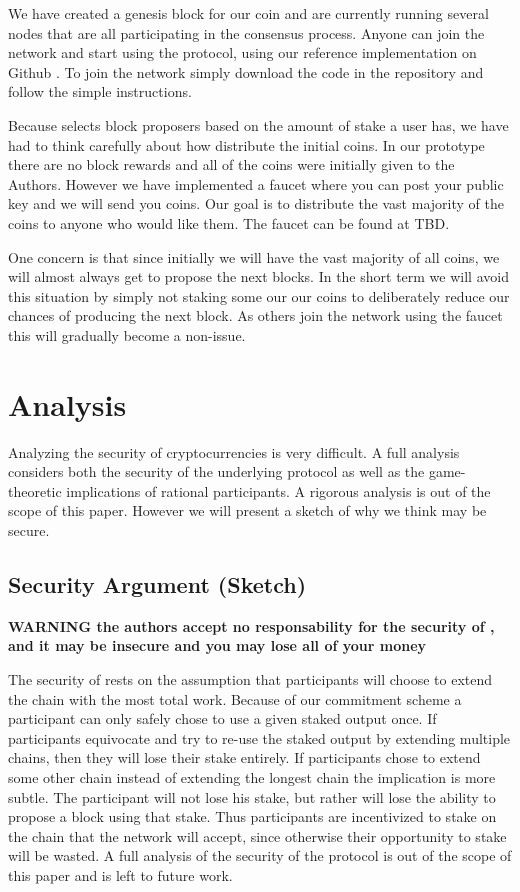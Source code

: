 \documentclass{article}
\begin{document}
We have created a genesis block for our coin and are currently running several nodes that are all participating in the consensus process. Anyone can join the network and start using the protocol, using our reference implementation on Github \cite{6824coincode}. To join the network simply download the code in the repository and follow the simple instructions.  

Because \coin selects block proposers based on the amount of stake a user has, we have had to think carefully about how distribute the initial coins. In our prototype there are no block rewards and all of the coins were initially given to the Authors. However we have implemented a faucet where you can post your public key and we will send you coins. Our goal is to distribute the vast majority of the coins to anyone who would like them. The faucet can be found at TBD. 

One concern is that since initially we will have the vast majority of all coins, we will almost always get to propose the next blocks. In the short term we will avoid this situation by simply not staking some our our coins to deliberately reduce our chances of producing the next block. As others join the network using the faucet this will gradually become a non-issue. 

\section{Analysis}
Analyzing the security of cryptocurrencies is very difficult. A full analysis considers both the security of the underlying protocol as well as the game-theoretic implications of rational participants. A rigorous analysis is out of the scope of this paper. However we will present a sketch of why we think \coin may be secure.

\subsection{Security Argument (Sketch)}\label{security}
\large{ \textbf{ WARNING the authors accept no responsability for the security of \coin, and it may be insecure and you may lose all of your money } }

The security of \coin rests on the assumption that participants will choose to extend the chain with the most total work. Because of our commitment scheme a participant can only safely chose to use a given staked output once. If participants equivocate and try to re-use the staked output by extending multiple chains, then they will lose their stake entirely. If participants chose to extend some other chain instead of extending the longest chain the implication is more subtle. The participant will not lose his stake, but rather will lose the ability to propose a block using that stake. Thus participants are incentivized to stake on the chain that the network will accept, since otherwise their opportunity to stake will be wasted. A full analysis of the security of the protocol is out of the scope of this paper and is left to future work.   
\end{document}
